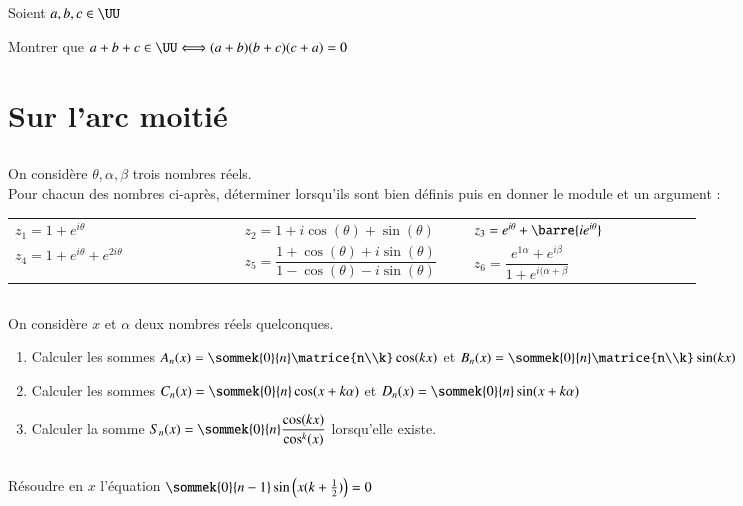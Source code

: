 \documentclass[oneside,12pt]{article}
\begin{document}
\subsection{}
Soient $a,b,c\in\UU$

Montrer que $a+b+c \in \UU \Longleftrightarrow (a+b)(b+c)(c+a)=0$ 



\section{Sur l'arc moitié}

\subsection{}
On considère $\theta,\alpha,\beta$ trois nombres réels.\\
Pour chacun des nombres ci-après, déterminer lorsqu'ils sont bien définis puis en donner le module et un argument :

\renewcommand{\arraystretch}{1.7}
\begin{tabular}{p{0.3\linewidth} p{0.3\linewidth} p{0.3\linewidth}}
	$z_1=1+e^{i\theta}$ & $z_2=1+i\cos(\theta)+\sin(\theta)$ & $z_3=e^{i\theta}+\barre{ie^{i\theta}}$ \\
	$z_4= 1+e^{i\theta}+e^{2i\theta}$ & $z_5=\dfrac{1+\cos(\theta)+i\sin(\theta)}{1-\cos(\theta)-i\sin(\theta)}$ & $z_6=\dfrac{e^{1\alpha}+e^{i\beta}}{1+e^{i(\alpha+\beta}}$
\end{tabular}

\subsection{}
On considère $x$ et $\alpha$ deux nombres réels quelconques.
\begin{enumerate}
	\item Calculer les sommes $A_n(x)=\sommek{0}{n}\matrice{n\\k}\cos(kx)$ \quad et \quad $B_n(x)=\sommek{0}{n}\matrice{n\\k}\sin(kx)$
	\item Calculer les sommes $C_n(x)=\sommek{0}{n}\cos(x+k\alpha)$  \quad et \quad  $D_n(x)=\sommek{0}{n}\sin(x+k\alpha)$
	\item Calculer la somme $S_n(x)=\sommek{0}{n}\dfrac{\cos(kx)}{\cos^k(x)}$ lorsqu'elle existe.
\end{enumerate}

\subsection{}
Résoudre en $x$ l'équation $\sommek{0}{n-1}\sin\left( x(k+\frac{1}{2}) \right) =0$
\end{document}
